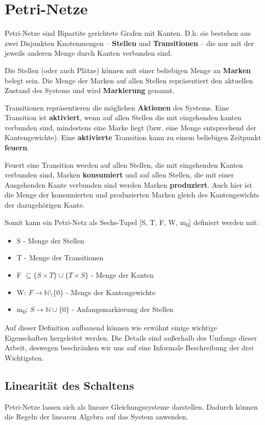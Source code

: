 

\chapter{Petri-Netze}
Petri-Netze sind Bipartite gerichtete Grafen mit Kanten.
D.h. sie bestehen aus zwei Disjunkten Knotenmengen -- \textbf{Stellen} und \textbf{Transitionen} -- die nur mit der jeweils anderen Menge durch Kanten verbunden sind.

Die Stellen (oder auch Plätze) können mit einer beliebigen Menge an \textbf{Marken} belegt sein.
Die Menge der Marken auf allen Stellen repräsentiert den aktuellen Zustand des Systems und wird \textbf{Markierung} genannt.

Transitionen repräsentieren die möglichen \textbf{Aktionen} des Systems. 
Eine Transition ist \textbf{aktiviert}, wenn auf allen Stellen die mit eingehenden kanten verbunden sind, mindestens eine Marke liegt (bzw. eine Menge entsprechend der Kantengewichte).
Eine \textbf{aktivierte} Transition kann zu einem beliebigen Zeitpunkt \textbf{feuern}.

Feuert eine Transition werden auf allen Stellen, die mit eingehenden Kanten verbunden sind, Marken \textbf{konsumiert} und auf allen Stellen, die mit einer Ausgehenden Kante verbunden sind werden Marken \textbf{produziert}.
Auch hier ist die Menge der konsumierten und produzierten Marken gleich des Kantengewichts der dazugehörigen Kante.

Somit kann ein Petri-Netz als Sechs-Tupel [S, T, F, W, m\textsubscript{0}] definiert werden mit:
\begin{itemize}
    \item S - Menge der Stellen
    \item T - Menge der Transitionen
    \item F $\subseteq \{ S \times T \} \cup \{ T \times S \}$ - Menge der Kanten
    \item W: $ F \to \mathbb{N} \setminus \{0\}$ - Menge der Kantengewichte
    \item m\textsubscript{0}: $S \to \mathbb{N} \cup \{0\}$ - Anfangsmarkierung der Stellen
\end{itemize}
Auf dieser Definition aufbauend können wie erwähnt einige wichtige Eigenschaften hergeleitet werden.
Die Details sind außerhalb des Umfangs dieser Arbeit, deswegen beschränken wir uns auf eine Informale Beschreibung der drei Wichtigsten.

\section{Linearität des Schaltens}
Petri-Netze lassen sich als lineare Gleichungssysteme darstellen. 
Dadurch können die Regeln der linearen Algebra auf das System anwenden. 

